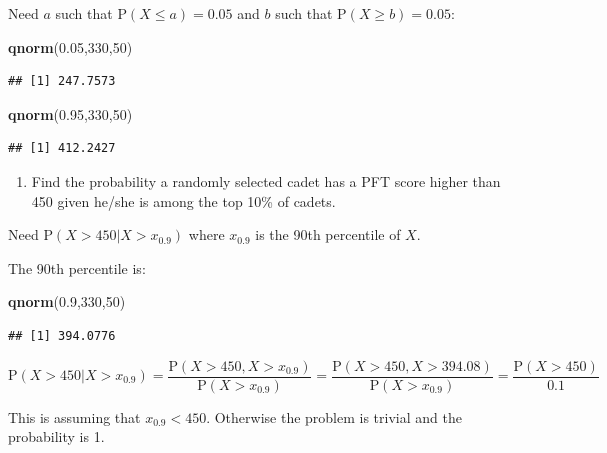 \documentclass[
]{book}
\newenvironment{Shaded}{\begin{snugshade}}{\end{snugshade}}
\newcommand{\DecValTok}[1]{\textcolor[rgb]{0.00,0.00,0.81}{#1}}
\newcommand{\FloatTok}[1]{\textcolor[rgb]{0.00,0.00,0.81}{#1}}
\newcommand{\KeywordTok}[1]{\textcolor[rgb]{0.13,0.29,0.53}{\textbf{#1}}}
\newcommand{\NormalTok}[1]{#1}
\providecommand{\tightlist}{%
  \setlength{\itemsep}{0pt}\setlength{\parskip}{0pt}}
\begin{document}
Need \(a\) such that \(\mbox{P}(X\leq a)=0.05\) and \(b\) such that \(\mbox{P}(X\geq b)=0.05\):

\begin{Shaded}
\begin{Highlighting}[]
\KeywordTok{qnorm}\NormalTok{(}\FloatTok{0.05}\NormalTok{,}\DecValTok{330}\NormalTok{,}\DecValTok{50}\NormalTok{)}
\end{Highlighting}
\end{Shaded}

\begin{verbatim}
## [1] 247.7573
\end{verbatim}

\begin{Shaded}
\begin{Highlighting}[]
\KeywordTok{qnorm}\NormalTok{(}\FloatTok{0.95}\NormalTok{,}\DecValTok{330}\NormalTok{,}\DecValTok{50}\NormalTok{)}
\end{Highlighting}
\end{Shaded}

\begin{verbatim}
## [1] 412.2427
\end{verbatim}

\begin{enumerate}
\def\labelenumi{\alph{enumi}.}
\setcounter{enumi}{3}
\tightlist
\item
  Find the probability a randomly selected cadet has a PFT score higher than 450 given he/she is among the top 10\% of cadets.
\end{enumerate}

Need \(\mbox{P}(X>450|X>x_{0.9})\) where \(x_{0.9}\) is the 90th percentile of \(X\).

The 90th percentile is:

\begin{Shaded}
\begin{Highlighting}[]
\KeywordTok{qnorm}\NormalTok{(}\FloatTok{0.9}\NormalTok{,}\DecValTok{330}\NormalTok{,}\DecValTok{50}\NormalTok{)}
\end{Highlighting}
\end{Shaded}

\begin{verbatim}
## [1] 394.0776
\end{verbatim}

\[
\mbox{P}(X>450|X>x_{0.9})=\frac{\mbox{P}(X>450, X>x_{0.9})}{\mbox{P}(X>x_{0.9})}=\frac{\mbox{P}(X>450, X>394.08)}{\mbox{P}(X>x_{0.9})}=\frac{\mbox{P}(X>450)}{0.1}
\]

This is assuming that \(x_{0.9}<450\). Otherwise the problem is trivial and the probability is 1.
\end{document}
